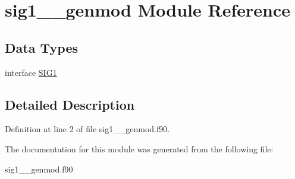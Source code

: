 \hypertarget{classsig1____genmod}{\section{sig1\+\_\+\+\_\+genmod Module Reference}
\label{classsig1____genmod}
}
\subsection*{Data Types}
\begin{DoxyCompactItemize}
\item 
interface \hyperlink{interfacesig1____genmod_1_1_s_i_g1}{S\+I\+G1}
\end{DoxyCompactItemize}


\subsection{Detailed Description}


Definition at line 2 of file sig1\+\_\+\+\_\+genmod.\+f90.



The documentation for this module was generated from the following file\+:\begin{DoxyCompactItemize}
\item 
sig1\+\_\+\+\_\+genmod.\+f90\end{DoxyCompactItemize}
